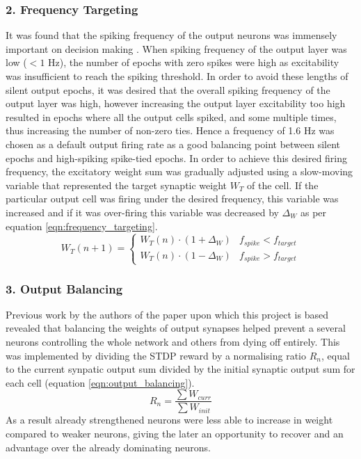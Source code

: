 \documentclass[11pt, twocolumn]{article}
\begin{document}
\subsubsection*{2. Frequency Targeting}
It was found that the spiking frequency of the output neurons was immensely important on decision making \cite{sanda2017multi}. When spiking frequency of the output layer was low ($<1$ Hz), the number of epochs with zero spikes were high as excitability was insufficient to reach the spiking threshold. In order to avoid these lengths of silent output epochs, it was desired that the overall spiking frequency of the output layer was high, however increasing the output layer excitability too high resulted in epochs where all the output cells spiked, and some multiple times, thus increasing the number of non-zero ties. Hence a frequency of 1.6 Hz was chosen as a default output firing rate as a good balancing point between silent epochs and high-spiking spike-tied epochs. In order to achieve this desired firing frequency, the excitatory weight sum was gradually adjusted using a slow-moving variable that represented the target synaptic weight $W_T$ of the cell. If the particular output cell was firing under the desired frequency, this variable was increased and if it was over-firing this variable was decreased by $\Delta_W$ as per equation \ref{eqn:frequency_targeting}.
\begin{equation}
	W_T(n+1) =
	\begin{cases} 
	W_T(n)\cdot(1+\Delta_W) & f_{spike} < f_{target} \\
	W_T(n)\cdot(1-\Delta_W) & f_{spike} > f_{target}
	\end{cases}
	\label{eqn:frequency_targeting}
\end{equation}

\subsubsection*{3. Output Balancing}
Previous work by the authors of the paper upon which this project is based \cite{skorheim2014spiking} revealed that balancing the weights of output synapses helped prevent a several neurons controlling the whole network and others from dying off entirely. This was implemented by dividing the \acs{STDP} reward by a normalising ratio $R_n$, equal to the current synpatic output sum divided by the initial synaptic output sum for each cell (equation \ref{eqn:output_balancing}).
\begin{equation}
	R_n = \frac{\sum W_{curr}}{\sum W_{init}}
	\label{eqn:output_balancing}
\end{equation}
As a result already strengthened neurons were less able to increase in weight compared to weaker neurons, giving the later an opportunity to recover and an advantage over the already dominating neurons.
\end{document}
